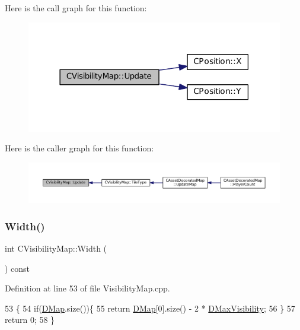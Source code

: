 Here is the call graph for this function\+:\nopagebreak
\begin{figure}[H]
\begin{center}
\leavevmode
\includegraphics[width=318pt]{classCVisibilityMap_a5ca9902ef0bc2714617719800e20aa19_cgraph}
\end{center}
\end{figure}
Here is the caller graph for this function\+:\nopagebreak
\begin{figure}[H]
\begin{center}
\leavevmode
\includegraphics[width=350pt]{classCVisibilityMap_a5ca9902ef0bc2714617719800e20aa19_icgraph}
\end{center}
\end{figure}
\hypertarget{classCVisibilityMap_ae916b942ca0d25d93eb8ecde5f08aef3}{}\label{classCVisibilityMap_ae916b942ca0d25d93eb8ecde5f08aef3} 
\subsubsection{\texorpdfstring{Width()}{Width()}}
{\footnotesize\ttfamily int C\+Visibility\+Map\+::\+Width (\begin{DoxyParamCaption}{ }\end{DoxyParamCaption}) const}



Definition at line 53 of file Visibility\+Map.\+cpp.


\begin{DoxyCode}
53                                \{
54     \textcolor{keywordflow}{if}(\hyperlink{classCVisibilityMap_ad217bc34f7a50dd357a3eeeb69cfdd85}{DMap}.size())\{
55         \textcolor{keywordflow}{return} \hyperlink{classCVisibilityMap_ad217bc34f7a50dd357a3eeeb69cfdd85}{DMap}[0].size() - 2 * \hyperlink{classCVisibilityMap_ac8f71b9541c903fce0294d75daa1bbb1}{DMaxVisibility};
56     \}
57     \textcolor{keywordflow}{return} 0;
58 \}
\end{DoxyCode}


